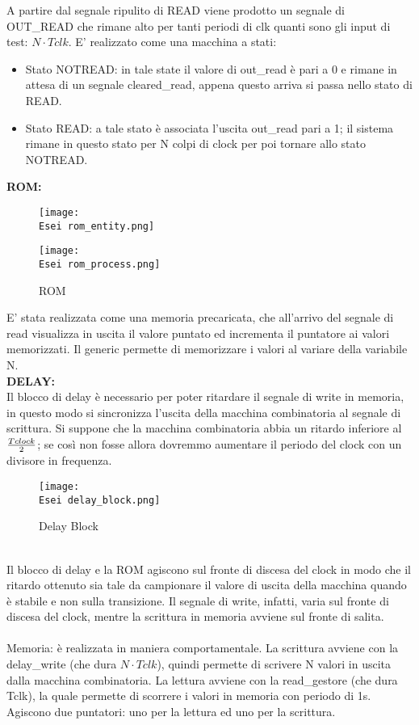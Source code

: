 \documentclass[12pt]{article}
\def \Esei {Allegati/Esercizio6/}
\begin{document}
\clearpage
A partire dal segnale ripulito di READ viene prodotto un segnale di OUT\_READ  che rimane alto per tanti periodi di clk quanti sono gli input di test: $N \cdot Tclk$. E’ realizzato come una macchina a stati:
\begin{itemize}
    \item Stato NOTREAD: in tale state il valore di out\_read è pari a 0 e rimane in attesa di un segnale cleared\_read, appena questo arriva si passa nello stato di READ.
    \item Stato READ: a tale stato è associata l’uscita out\_read pari a 1; il sistema rimane in questo stato per N colpi di clock per poi tornare allo stato NOTREAD.
\end{itemize}
{\large \textbf{ROM:}}
\begin{figure}[ht!]
    \centering
    \texttt{[image: \\Esei rom\_entity.png]}
\end{figure}
\begin{figure}[ht!]
    \centering
    \texttt{[image: \\Esei rom\_process.png]}
    \caption{ROM}
\end{figure}
\clearpage
E’ stata realizzata come una memoria precaricata, che all’arrivo del segnale di read visualizza in uscita il valore puntato ed incrementa il puntatore ai valori memorizzati. Il generic permette di memorizzare i valori al variare della variabile N.
\\{\large \textbf{DELAY:}}
\\Il blocco di delay è necessario per poter ritardare il segnale di write in memoria, in questo modo si sincronizza l’uscita della macchina combinatoria al segnale di scrittura. Si suppone che la macchina combinatoria abbia un ritardo inferiore al $Tclock\over{2}$; se così non fosse allora dovremmo aumentare il periodo del clock con un divisore in frequenza.
\begin{figure}[ht!]
    \centering
    \texttt{[image: \\Esei delay\_block.png]}
    \caption{Delay Block}
\end{figure}
\\Il blocco di delay e la ROM agiscono sul fronte di discesa del clock in modo che il ritardo ottenuto sia tale da campionare il valore di uscita della macchina quando è stabile e non sulla transizione. Il segnale di write, infatti, varia sul fronte di discesa del clock, mentre la scrittura in memoria avviene sul fronte di salita.
\\\\Memoria: è realizzata in maniera comportamentale. La scrittura avviene con la delay\_write (che dura $N \cdot Tclk$), quindi permette di scrivere N valori in uscita dalla macchina combinatoria. La lettura avviene con la read\_gestore (che dura Tclk), la quale permette di scorrere i valori in memoria con periodo di 1s. Agiscono due puntatori: uno per la lettura ed uno per la scrittura.
\end{document}
